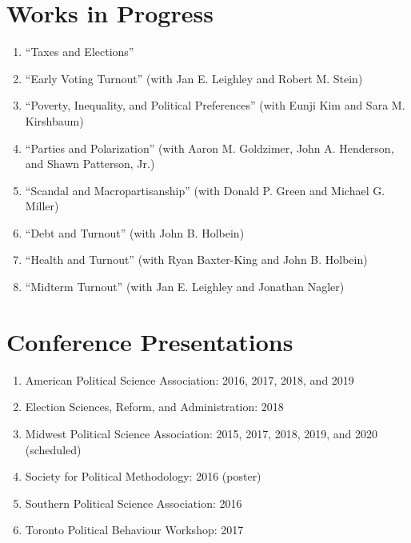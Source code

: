 \documentclass[12pt]{article}
\begin{document}
\section*{Works in Progress}

\begin{enumerate}[topsep = 0pt, itemsep = 1ex, partopsep  = 1ex, parsep = 1ex]

	\item[] ``Taxes and Elections''

	\item[] ``Early Voting Turnout'' (with Jan E. Leighley and Robert M. Stein)
	
	\item[] ``Poverty, Inequality, and Political Preferences'' (with Eunji Kim and Sara M. Kirshbaum)
	
	\item[] ``Parties and Polarization'' (with Aaron M. Goldzimer, John A. Henderson, and Shawn Patterson, Jr.)
	
	\item[] ``Scandal and Macropartisanship'' (with Donald P. Green and Michael G. Miller)
	
	\item[] ``Debt and Turnout'' (with John B. Holbein)
	
	\item[] ``Health and Turnout'' (with Ryan Baxter-King and John B. Holbein)
	
	\item[] ``Midterm Turnout'' (with Jan E. Leighley and Jonathan Nagler)

\end{enumerate}

\section*{Conference Presentations}

\begin{enumerate}[topsep = 0pt, itemsep = 1ex, partopsep  = 1ex, parsep = 1ex]
	
	\item[] American Political Science Association: 2016, 2017, 2018, and 2019
	
	\item[] Election Sciences, Reform, and Administration: 2018 
	
	\item[] Midwest Political Science Association: 2015, 2017, 2018, 2019, and 2020 (scheduled)
	
	\item[] Society for Political Methodology: 2016 (poster)
	
	\item[] Southern Political Science Association: 2016
	
	\item[] Toronto Political Behaviour Workshop: 2017
	
\end{enumerate}
\end{document}
